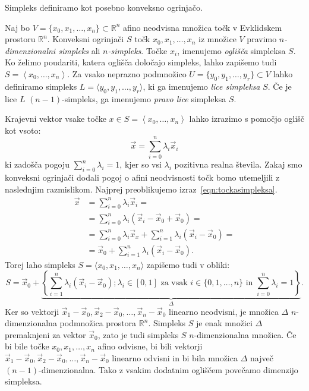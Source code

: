 \documentclass[mat1]{fmfdelo}
\newcommand{\R}{\mathbb R}
\newcommand{\0}{\underline{0}}
\begin{document}
Simpleks definiramo kot posebno konveksno ogrinjačo.
\begin{definicija}
Naj bo $V = \{x_0, x_1, \dots , x_n \} \subset \R^n$ afino neodvisna množica točk v Evklidskem prostoru $\R^n$. Konveksni ogrinjači $S$ točk $x_0, x_1, \dots , x_n$ iz množice $V$ pravimo \emph{$n$-dimenzionalni simpleks} ali \emph{$n$-simpleks}. Točke $x_i$, imenujemo \emph{oglišča} simpleksa $S$. Ko želimo poudariti, katera oglišča določajo simpleks, lahko zapišemo tudi $S = \left < x_0, \dots, x_n \right >$. Za vsako neprazno podmnožico $U = \{ y_0, y_1, \dots, y_r \} \subset V$ lahko definiramo simpleks $L = \langle y_0, y_1, \dots, y_r \rangle$, ki ga imenujemo \emph{lice simpleksa} $S$. Če je lice $L$ $(n-1)$-simpleks, ga imenujemo \emph{pravo lice} simpleksa $S$. 
\end{definicija}
 Krajevni vektor vsake točke $x \in S = \left < x_0, \dots, x_n \right >$ lahko izrazimo s pomočjo oglišč kot vsoto:
\begin{equation}\label{eqn:tockasimpleksa}
\vec{x} = \sum\limits_{i=0}^n \lambda_i \vec{x}_i
\end{equation}
ki zadošča pogoju $\sum\limits_{i=0}^n \lambda_i = 1$, kjer so vsi $\lambda_i$ pozitivna realna števila. Zakaj smo konveksni ogrinjači dodali pogoj o afini neodvisnosti točk bomo utemeljili z naslednjim razmislikom. Najprej preoblikujemo izraz~\eqref{eqn:tockasimpleksa}. 
\begin{align*}
\vec{x} &= \sum\limits_{i=0}^n \lambda_i \vec{x}_i =\\
&= \sum\limits_{i=0}^n \lambda_i (\vec{x}_i - \vec{x}_0 + \vec{x}_0) =\\
&= \sum\limits_{i=0}^n \lambda_i \vec{x}_x + \sum\limits_{i=1}^n \lambda_i (\vec{x}_i - \vec{x}_0) =\\
&= \vec{x}_0 + \sum\limits_{i=1}^n \lambda_i (\vec{x}_i - \vec{x}_0).
\end{align*}
Torej laho simpleks $S = \langle x_0, x_1, \dots, x_n \rangle$ zapišemo tudi v obliki:
$$S = \vec{x}_0 + \underbrace{\left \{ \sum\limits_{i=1}^n \lambda_i (\vec{x}_i - \vec{x}_0); \lambda_i \in [0, 1] \text{ za vsak } i \in \{0, 1, \dots, n \} \text{ in } \sum\limits_{i=0}^n \lambda_i = 1  \right \}}_{\Delta}.$$
Ker so vektorji $\vec{x}_1 - \vec{x}_0, \vec{x}_2 - \vec{x}_0, \dots, \vec{x}_n - \vec{x}_0$ linearno neodvisni, je množica $\Delta$ $n$-dimenzionalna podmnožica prostora $\R^n$. Simpleks $S$ je enak množici $\Delta$ premaknjeni za vektor $\vec{x}_0$, zato je tudi simpleks $S$ $n$-dimenzionalna množica. Če bi bile točke $x_0, x_1, \dots, x_n$ afino odvisne, bi bili vektorji $\vec{x}_1 - \vec{x}_0, \vec{x}_2 - \vec{x}_0, \dots, \vec{x}_n - \vec{x}_0$ linearno odvisni in bi bila množica $\Delta$ največ $(n-1)$-dimenzionalna. Tako z vsakim dodatnim ogliščem povečamo dimenzijo simpleksa.
\end{document}
